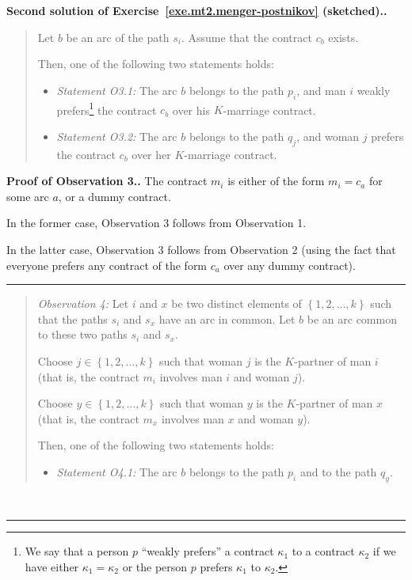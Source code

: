 \documentclass[numbers=enddot,12pt,final,onecolumn,notitlepage]{scrartcl}%
\theoremstyle{definition}
\newenvironment{statement}{\begin{quote}}{\end{quote}}
\newenvironment{proof}[1][Proof]{\noindent\textbf{#1.} }{\ \rule{0.5em}{0.5em}}
\newcommand{\set}[1]{\left\{ #1 \right\}}
\begin{document}
\begin{proof}[Second solution of
Exercise~\ref{exe.mt2.menger-postnikov} (sketched).]
\begin{statement}
Let $b$ be an arc of the path $s_i$.
Assume that the contract $c_b$ exists.

Then, one of the following two statements holds:

\begin{itemize}
\item \textit{Statement O3.1:}
   The arc $b$ belongs to the path $p_i$, and
   man $i$ weakly prefers\footnote{We say that a person
   $p$ ``weakly prefers'' a contract $\kappa_1$ to a
   contract $\kappa_2$ if we have either
   $\kappa_1 = \kappa_2$ or the person $p$ prefers
   $\kappa_1$ to $\kappa_2$.}   
   the contract $c_b$ over his $K$-marriage contract.

\item \textit{Statement O3.2:}
   The arc $b$ belongs to the path $q_j$, and
   woman $j$ prefers
   the contract $c_b$ over her $K$-marriage contract.
\end{itemize}
\end{statement}

\begin{proof}[Proof of Observation 3.]
The contract $m_i$ is either of the form $m_i = c_a$ for
some arc $a$, or a dummy contract.

In the former case, Observation 3 follows from
Observation 1.

In the latter case, Observation 3 follows from
Observation 2 (using the fact that everyone prefers
any contract of the form $c_a$ over any dummy contract).
\end{proof}

\begin{statement}
\textit{Observation 4:}
Let $i$ and $x$ be two distinct elements of
$\set{1, 2, \ldots, k}$ such that the paths $s_i$ and $s_x$ have
an arc in common.
Let $b$ be an arc common to these two paths $s_i$ and $s_x$.

Choose $j \in \set{1, 2, \ldots, k}$ such that
woman $j$ is the $K$-partner of man $i$
(that is, the contract $m_i$ involves man $i$ and woman $j$).

Choose $y \in \set{1, 2, \ldots, k}$ such that
woman $y$ is the $K$-partner of man $x$
(that is, the contract $m_x$ involves man $x$ and woman $y$).

Then, one of the following two statements holds:

\begin{itemize}
\item \textit{Statement O4.1:}
   The arc $b$ belongs to the path $p_i$ and to the
   path $q_y$.


\end{itemize}
\end{statement}
\end{proof}
\end{document}
